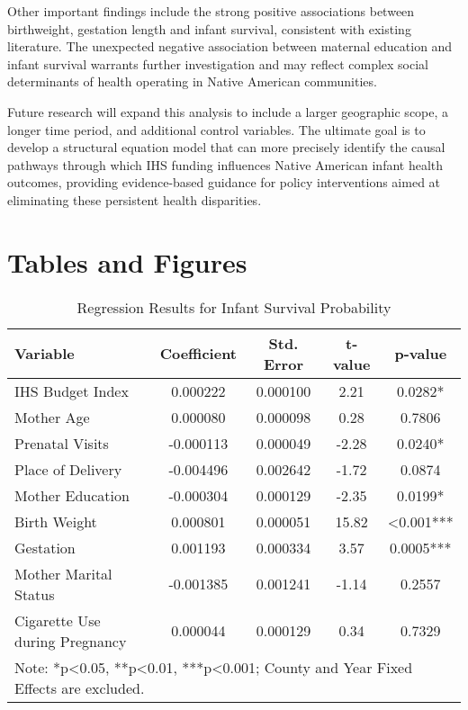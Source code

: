 \documentclass[12pt]{article}
\begin{document}
Other important findings include the strong positive associations between birthweight, gestation length and infant survival, consistent with existing literature. The unexpected negative association between maternal education and infant survival warrants further investigation and may reflect complex social determinants of health operating in Native American communities.

Future research will expand this analysis to include a larger geographic scope, a longer time period, and additional control variables. The ultimate goal is to develop a structural equation model that can more precisely identify the causal pathways through which IHS funding influences Native American infant health outcomes, providing evidence-based guidance for policy interventions aimed at eliminating these persistent health disparities.

\newpage




\section*{Tables and Figures}

\begin{table}[h]
\caption{Regression Results for Infant Survival Probability}
\label{tab:regression}
\centering
\begin{tabular}{lcccc}
\toprule
Variable & Coefficient & Std. Error & t-value & p-value \\
\midrule
IHS Budget Index & 0.000222 & 0.000100 & 2.21 & 0.0282* \\
Mother Age & 0.000080 & 0.000098 & 0.28 & 0.7806 \\
Prenatal Visits & -0.000113 & 0.000049 & -2.28 & 0.0240* \\
Place of Delivery & -0.004496 & 0.002642 & -1.72 & 0.0874 \\
Mother Education & -0.000304 & 0.000129 & -2.35 & 0.0199* \\
Birth Weight & 0.000801 & 0.000051 & 15.82 & <0.001*** \\
Gestation & 0.001193 & 0.000334 & 3.57 & 0.0005*** \\
Mother Marital Status & -0.001385 & 0.001241 & -1.14 & 0.2557 \\
Cigarette Use during Pregnancy & 0.000044 & 0.000129 & 0.34 & 0.7329 \\
\bottomrule
\multicolumn{5}{l}{\small Note: *p<0.05, **p<0.01, ***p<0.001; County and Year Fixed Effects are excluded.}
\end{tabular}
\end{table}
\end{document}
